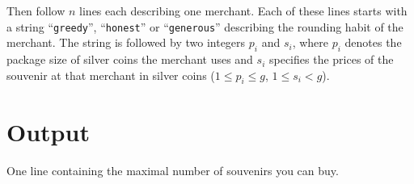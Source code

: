 Then follow $n$ lines each describing one merchant. Each of these lines starts
with a string ``{\tt greedy}'', ``{\tt honest}'' or ``{\tt generous}''
describing the rounding habit of the merchant. The string is followed by two
integers $p_i$ and $s_i$, where $p_i$ denotes the package size of silver coins
the merchant uses and $s_i$ specifies the prices of the souvenir at that
merchant in silver coins ($1 \leq p_i \leq g$, $1 \leq s_i < g$).

\section*{Output}
One line containing the maximal number of souvenirs you can buy.
